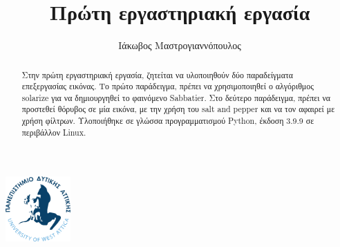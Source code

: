 \documentclass{fphw}
\title{Πρώτη εργαστηριακή εργασία}
\author{Ιάκωβος Μαστρογιαννόπουλος}
\institute{Πανεπιστημιο Δυτικης Αττικης \\ Τμημα Μηχανικων Πληροφορικης και Υπολογιστων}
\begin{document}
\includegraphics[width=25mm]{Figures/Logo}
\maketitle

\begin{abstract}
	Στην πρώτη εργαστηριακή εργασία, ζητείται να υλοποιηθούν δύο παραδείγματα επεξεργασίας εικόνας. Το πρώτο παράδειγμα, πρέπει να χρησιμοποιηθεί ο αλγόριθμος solarize
	για να δημιουργηθεί το φαινόμενο Sabbatier. Στο δεύτερο παράδειγμα, πρέπει να προστεθεί θόρυβος σε μία εικόνα, με την χρήση του salt and pepper και να τον αφαιρεί με χρήση φίλτρων.
	Υλοποιήθηκε σε γλώσσα προγραμματισμού Python, έκδοση 3.9.9 σε περιβάλλον Linux.
\end{abstract}

\newpage
\tableofcontents
\lstlistoflistings
\listoffigures
\listoftables

\newpage



\end{document}
